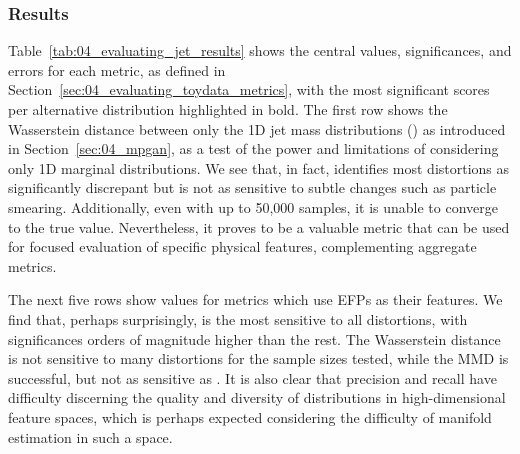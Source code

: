 \subsubsection{Results}
\label{sec:04_evaluating_jetdata_results} 

\begin{table}[ht!]
\caption[Values, significances, and errors of metrics for each jet distribution.]{Values, significances, and errors of metrics, as defined in Sections~\ref{sec:04_evaluating_toydata_metrics} and~\ref{sec:04_evaluating_jetdata_results}, for each jet distribution, for the largest sample size tested. EFP and PN refer to metrics using EFPs and ParticleNet activations as their input features, respectively. 
The most significant scores per distribution are in bold.\label{tab:04_evaluating_jet_results}}
\begin{adjustwidth}{-1in}{-1in}%
\centering{}
\end{adjustwidth}
\end{table}

Table~\ref{tab:04_evaluating_jet_results} shows the central values, significances, and errors for each metric, as defined in Section~\ref{sec:04_evaluating_toydata_metrics}, with the most significant scores per alternative distribution highlighted in bold.
The first row shows the Wasserstein distance between only the 1D jet mass distributions (\wassm) as introduced in Section~\ref{sec:04_mpgan}, as a test of the power and limitations of considering only 1D marginal distributions.
We see that, in fact, \wassm identifies most distortions as significantly discrepant but is not as sensitive to subtle changes such as particle \ptrel smearing.
Additionally, even with up to 50,000 samples, it is unable to converge to the true value.
Nevertheless, it proves to be a valuable metric that can be used for focused evaluation of specific physical features, complementing aggregate metrics.

The next five rows show values for metrics which use EFPs as their features.
We find that, perhaps surprisingly, \fgdinf is the most sensitive to all distortions, with significances orders of magnitude higher than the rest.
The Wasserstein distance is not sensitive to many distortions for the sample sizes tested, while the MMD is successful, but not as sensitive as \fgdinf.
It is also clear that precision and recall have difficulty discerning the quality and diversity of distributions in high-dimensional feature spaces, which is perhaps expected considering the difficulty of manifold estimation in such a space.


